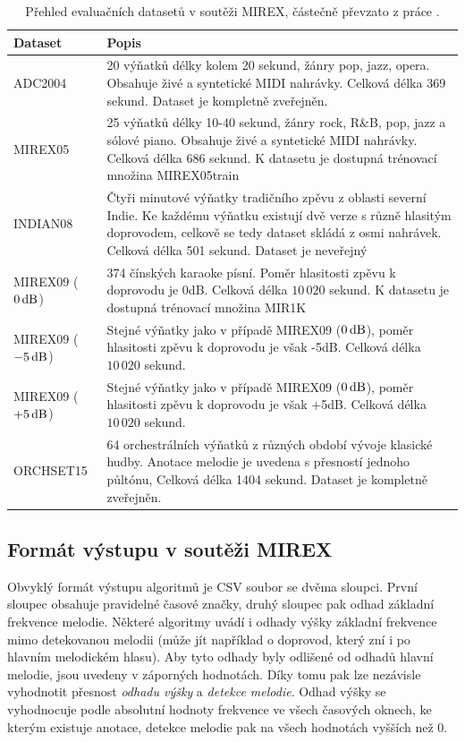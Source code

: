 \begin{table}[h!]
\centering
\begin{tabular}{p{2.5cm}p{11cm}}
\toprule
Dataset        & Popis \\
\midrule
ADC2004        & 20 výňatků délky kolem 20 sekund, žánry pop, jazz, opera. Obsahuje živé a syntetické MIDI nahrávky. Celková délka 369 sekund. Dataset je kompletně zveřejněn. \\
MIREX05        & 25 výňatků délky 10-40 sekund, žánry rock, R\&B, pop, jazz a sólové piano. Obsahuje živé a syntetické MIDI nahrávky. Celková délka 686 sekund. K datasetu je dostupná trénovací množina MIREX05train \\
INDIAN08       & Čtyři minutové výňatky tradičního zpěvu z oblasti severní Indie. Ke každému výňatku existují dvě verze s různě hlasitým doprovodem, celkově se tedy dataset skládá z osmi nahrávek. Celková délka 501 sekund. Dataset je neveřejný \\
MIREX09 ($0\,\rm dB$)  & 374 čínských karaoke písní. Poměr hlasitosti zpěvu k doprovodu je 0dB. Celková délka $10\,020$ sekund. K datasetu je dostupná trénovací množina MIR1K \\
MIREX09 ($-5\,\rm dB$) & Stejné výňatky jako v případě MIREX09 ($0\,\rm dB$), poměr hlasitosti zpěvu k doprovodu je však -5dB. Celková délka $10\,020$ sekund. \\
MIREX09 ($+5\,\rm dB$) & Stejné výňatky jako v případě MIREX09 ($0\,\rm dB$), poměr hlasitosti zpěvu k doprovodu je však +5dB. Celková délka $10\,020$ sekund. \\
ORCHSET15      & 64 orchestrálních výňatků z různých období vývoje klasické hudby. Anotace melodie je uvedena s přesností jednoho půltónu, Celková délka 1404 sekund. Dataset je kompletně zveřejněn. \\
\bottomrule
\end{tabular}
\caption{Přehled evaluačních datasetů v soutěži MIREX, částečně převzato z práce \cite{Salamon2014}.}\label{tab:mirex_datasety}
\end{table}


\subsection{Formát výstupu v soutěži MIREX}

Obvyklý formát výstupu algoritmů je CSV soubor se dvěma sloupci. První sloupec obsahuje pravidelné časové značky, druhý sloupec pak odhad základní frekvence melodie. Některé algoritmy uvádí i odhady výšky základní frekvence mimo detekovanou melodii (může jít například o doprovod, který zní i po hlavním melodickém hlasu). Aby tyto odhady byly odlišené od odhadů hlavní melodie, jsou uvedeny v záporných hodnotách. Díky tomu pak lze nezávisle vyhodnotit přesnost \textit{odhadu výšky} a \textit{detekce melodie}. Odhad výšky se vyhodnocuje podle absolutní hodnoty frekvence ve všech časových oknech, ke kterým existuje anotace, detekce melodie pak na všech hodnotách vyšších než 0. 

